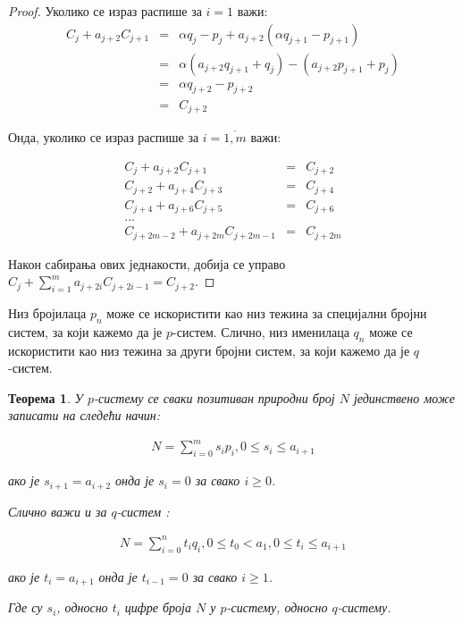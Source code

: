 \documentclass[a4paper]{article}
\newtheorem{theorem}{Теорема}
\begin{document}
\begin{proof}
    Уколико се израз распише за $ i = 1 $ важи:
	\begin{eqnarray*}
		C_{j} + a_{j+2}C_{j+1} &=& \alpha q_{j} - p_{j} + a_{j+2}(\alpha q_{j+1} - p_{j+1})\\
							   &=& \alpha (a_{j+2}q_{j+1} + q_{j}) - (a_{j+2}p_{j+1} + p_{j})\\
							   &=& \alpha q_{j+2} - p_{j+2} \\
							   &=& C_{j+2}
	\end{eqnarray*}

	Онда, уколико се израз распише за $ i=\overline{1,m} $ важи:
	
	\begin{eqnarray*}
		C_{j} + a_{j+2}C_{j+1} &=& C_{j+2}\\
		C_{j+2} + a_{j+4}C_{j+3} &=& C_{j+4}\\
		C_{j+4} + a_{j+6}C_{j+5} &=& C_{j+6}\\
		\ldots \\
		C_{j+2m-2} + a_{j+2m}C_{j+2m-1} &=& C_{j+2m}		
	\end{eqnarray*}

	Након сабирања ових једнакости, добија се управо $ C_{j} + \sum_{i=1}^{m} a_{j+2i}C_{j+2i-1} = C_{j+2} $.
\end{proof}

Низ бројилаца $ p_{n} $ може се искористити као низ тежина за специјални бројни систем, за који кажемо да је $ p $-систем. Слично, низ именилаца $ q_{n} $ може се искористити као низ тежина за други бројни систем, за који кажемо да је $ q $-систем.

\begin{theorem}
	\label{thm:p_q_sistemi}
	У $ p $-систему се сваки позитиван природни број $ N $ јединствено може записати на следећи начин:
	
	\begin{eqnarray}
		\label{p_sistem} N = \sum_{i=0}^{m} s_{i}p_{i}, 0 \le s_{i} \le a_{i+1}
	\end{eqnarray}
	
	ако је $ s_{i+1} = a_{i+2} $ онда је $ s_{i} = 0  $ за свако $ i \ge 0 $.
	
	Слично важи и за $ q $-систем :
	
	\begin{eqnarray}
		\label{q_sistem} N = \sum_{i=0}^{n} t_{i}q_{i}, 0 \le t_{0} < a_{1}, 0 \le t_{i} \le a_{i+1}
	\end{eqnarray}
	
	ако је $ t_{i} = a_{i+1} $ онда је $ t_{i-1} = 0 $ за свако $ i \ge 1 $.
	
	Где су $ s_{i} $, односно $ t_{i} $ цифре броја $ N $  у $ p $-систему, односно $ q $-систему.
\end{theorem} 
\end{document}
